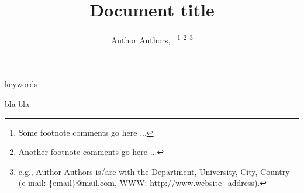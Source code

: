 \documentclass[journal,onecolumn]{IEEEtran}
\title{ Document title}
\author{Author Authors,~\IEEEmembership{Student/Member/Fellow,~IEEE}
	\thanks{Some footnote comments go here ...}%
	\thanks{Another footnote comments go here ...}%
	\thanks{e.g., Author Authors is/are with the
			Department,
			University,
			City, Country (e-mail: \{email\}@mail.com,
			WWW: http://www.website\_address).}%
}
\begin{document}
\maketitle

\begin{IEEEkeywords}
keywords
\end{IEEEkeywords}

\IEEEpeerreviewmaketitle

bla bla \cite{DeBoor2001ParctGuideToSplines}

\vspace{-5mm}


\end{document}
